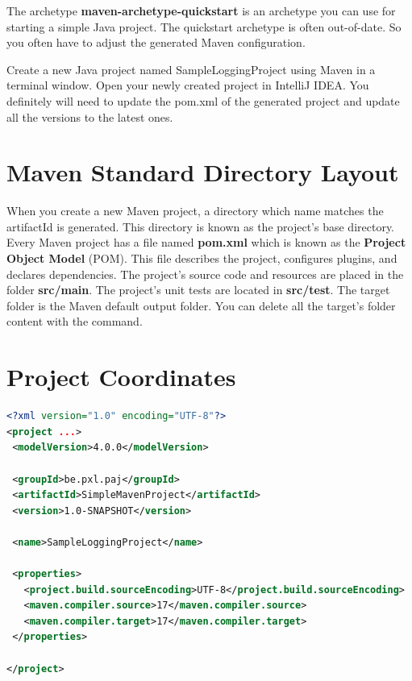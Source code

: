 The archetype \textbf{maven-archetype-quickstart} is an archetype you can use for starting a simple Java project. The quickstart archetype is often out-of-date. So you often have to adjust the generated Maven configuration.

\begin{oefening}

Create a new Java project named SampleLoggingProject using Maven in a terminal window. Open your newly created project in IntelliJ IDEA.  You definitely will need to update the pom.xml of the generated project and update all the versions to the latest ones.
\end{oefening}


\section{Maven Standard Directory Layout}

When you create a new Maven project, a directory which name matches the artifactId is generated. This directory is known as the project’s base directory. 
Every Maven project has a file named \textbf{pom.xml} which is known as the \textbf{Project Object Model} (POM). This file describes the project, configures plugins, and declares dependencies.
The project’s source code and resources are placed in the folder \textbf{src/main}.
The project’s unit tests are located in \textbf{src/test}.
The target folder is the Maven default output folder. You can delete all the target's folder content with the  command.


\section{Project Coordinates}

\begin{lstlisting}[language=xml, frame=single]
<?xml version="1.0" encoding="UTF-8"?>
<project ...>
 <modelVersion>4.0.0</modelVersion>

 <groupId>be.pxl.paj</groupId>
 <artifactId>SimpleMavenProject</artifactId>
 <version>1.0-SNAPSHOT</version>

 <name>SampleLoggingProject</name>

 <properties>
   <project.build.sourceEncoding>UTF-8</project.build.sourceEncoding>
   <maven.compiler.source>17</maven.compiler.source>
   <maven.compiler.target>17</maven.compiler.target>
 </properties>

</project>
\end{lstlisting}

